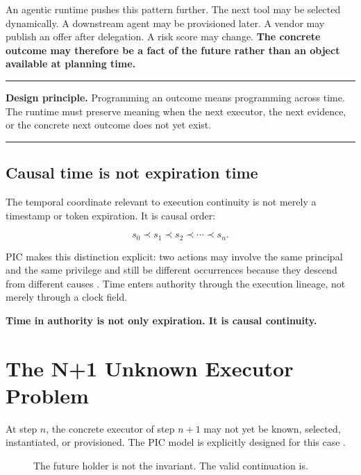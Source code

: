 \documentclass[10pt,oneside,openany]{book}
\newcommand{\principle}[1]{%
  \vspace{4pt}
  \noindent\begin{minipage}{\linewidth}
  \hrule\vspace{5pt}
  \small\sffamily\raggedright\textbf{Design principle.} #1
  \vspace{5pt}\hrule
  \end{minipage}\vspace{4pt}
}
\begin{document}
An agentic runtime pushes this pattern further. The next tool may be selected dynamically. A downstream agent may be provisioned later. A vendor may publish an offer after delegation. A risk score may change. \textbf{The concrete outcome may therefore be a fact of the future rather than an object available at planning time.}

\principle{Programming an outcome means programming across time. The runtime must preserve meaning when the next executor, the next evidence, or the concrete next outcome does not yet exist.}

\section{Causal time is not expiration time}
The temporal coordinate relevant to execution continuity is not merely a timestamp or token expiration. It is causal order:

\[
s_0 \prec s_1 \prec s_2 \prec \cdots \prec s_n.
\]

PIC makes this distinction explicit: two actions may involve the same principal and the same privilege and still be different occurrences because they descend from different causes \cite{gallo2026pic}. Time enters authority through the execution lineage, not merely through a clock field.

\begin{center}
\sffamily\bfseries
Time in authority is not only expiration. It is causal continuity.
\end{center}

\chapter{The N+1 Unknown Executor Problem}

At step $n$, the concrete executor of step $n+1$ may not yet be known, selected, instantiated, or provisioned. The PIC model is explicitly designed for this case \cite{gallo2026pic,picwhy}.

\begin{figure}[ht]
\centering
{}
\caption{The future holder is not the invariant. The valid continuation is.}
\end{figure}
\end{document}
